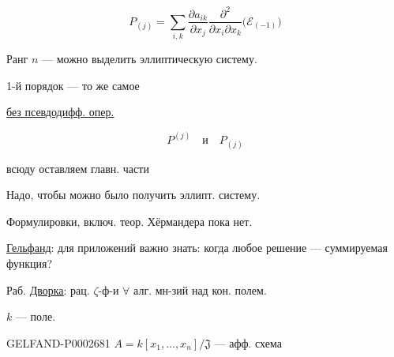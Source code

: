 \begin{equation*}
P_{(j)}=\sum_{i,k}\frac{\partial a_{ik}}{\partial x_j}
\frac{\partial^2}{\partial x_i\partial x_k}\bigl(\mathcal E_{(-1)}\bigr)
\end{equation*}

Ранг $n$ --- можно выделить эллиптическую систему.

1-й порядок --- то же самое

\underline{без псевдодифф. опер.}

\begin{equation*}P^{(j)}\quad\text{и}\quad P_{(j)}\end{equation*}

всюду оставляем главн. части

Надо, чтобы можно было получить эллипт. систему.

Формулировки, включ. теор. Хёрмандера пока нет.



\hfill{}

\underline{Гельфанд}: для приложений важно знать: когда любое решение --- суммируемая функция?


Раб. \underline{\underline{Дворка}}: рац. $\zeta$-ф-и $\forall$ алг. мн-зий над кон. полем.

$k$ --- поле.

\begin{GelfandAdjacentEvidence}{GELFAND-P000268}{1}
$A=k[x_1,\ldots,x_n]/\mathfrak J$ --- афф. схема

\end{GelfandAdjacentEvidence}



